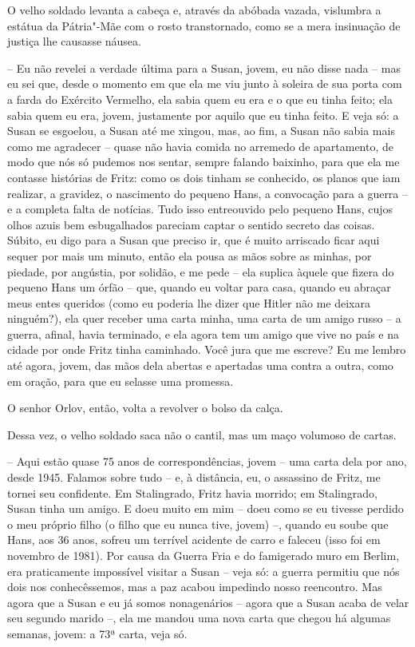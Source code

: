 O velho soldado levanta a cabeça e, através da abóbada vazada, vislumbra
a estátua da Pátria"-Mãe com o rosto transtornado, como se a mera
insinuação de justiça lhe causasse náusea.

-- Eu não revelei a verdade última para a Susan, jovem, eu não disse
nada -- mas eu sei que, desde o momento em que ela me viu junto à
soleira de sua porta com a farda do Exército Vermelho, ela sabia quem eu
era e o que eu tinha feito; ela sabia quem eu era, jovem, justamente por
aquilo que eu tinha feito. E veja só: a Susan se esgoelou, a Susan até
me xingou, mas, ao fim, a Susan não sabia mais como me agradecer --
quase não havia comida no arremedo de apartamento, de modo que nós só
pudemos nos sentar, sempre falando baixinho, para que ela me contasse
histórias de Fritz: como os dois tinham se conhecido, os planos que iam
realizar, a gravidez, o nascimento do pequeno Hans, a convocação para a
guerra -- e a completa falta de notícias. Tudo isso entreouvido pelo
pequeno Hans, cujos olhos azuis bem esbugalhados pareciam captar o
sentido secreto das coisas. Súbito, eu digo para a Susan que preciso ir,
que é muito arriscado ficar aqui sequer por mais um minuto, então ela
pousa as mãos sobre as minhas, por piedade, por angústia, por solidão, e
me pede -- ela suplica àquele que fizera do pequeno Hans um órfão --
que, quando eu voltar para casa, quando eu abraçar meus entes queridos
(como eu poderia lhe dizer que Hitler não me deixara ninguém?), ela quer
receber uma carta minha, uma carta de um amigo russo -- a guerra,
afinal, havia terminado, e ela agora tem um amigo que vive no país e na
cidade por onde Fritz tinha caminhado. Você jura que me escreve? Eu me
lembro até agora, jovem, das mãos dela abertas e apertadas uma contra a
outra, como em oração, para que eu selasse uma promessa.

O senhor Orlov, então, volta a revolver o bolso da calça.

Dessa vez, o velho soldado saca não o cantil, mas um maço volumoso de
cartas.

-- Aqui estão quase 75 anos de correspondências, jovem -- uma carta dela
por ano, desde 1945. Falamos sobre tudo -- e, à distância, eu, o
assassino de Fritz, me tornei seu confidente. Em Stalingrado, Fritz
havia morrido; em Stalingrado, Susan tinha um amigo. E doeu muito em mim
-- doeu como se eu tivesse perdido o meu próprio filho (o filho que eu
nunca tive, jovem) --, quando eu soube que Hans, aos 36 anos, sofreu um
terrível acidente de carro e faleceu (isso foi em novembro de 1981). Por
causa da Guerra Fria e do famigerado muro em Berlim, era praticamente
impossível visitar a Susan -- veja só: a guerra permitiu que nós dois
nos conhecêssemos, mas a paz acabou impedindo nosso reencontro. Mas
agora que a Susan e eu já somos nonagenários -- agora que a Susan acaba
de velar seu segundo marido --, ela me mandou uma nova carta que chegou
há algumas semanas, jovem: a 73ª carta, veja só.

